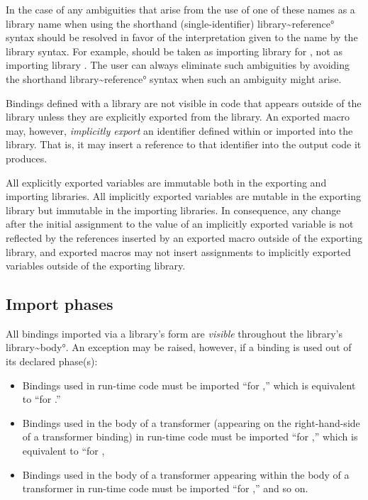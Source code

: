\documentclass{monograph}
\begin{document}
In the case of any ambiguities that arise from the use of one of
these names as a library name when using the shorthand (single-identifier)
\ang{library~reference} syntax should be resolved in favor of the interpretation
given to the name by the library syntax.
For example,  should be taken as
importing library  for , not as importing
library .
The user can always eliminate such ambiguities by avoiding the shorthand
\ang{library~reference} syntax when such an ambiguity might arise.

Bindings defined with a library are not visible in code that appears
outside of the library unless they are explicitly exported from the
library. 
An exported macro may, however, \emph{implicitly export} an identifier
defined within or imported into the library.
That is, it may insert a reference to that identifier into the output code
it produces.

All explicitly exported variables are immutable both in the exporting and
importing libraries.
All implicitly exported variables are mutable in the exporting library but
immutable in the importing libraries.
In consequence, any change after the initial assignment to the value of an
implicitly exported variable is not reflected by the references inserted
by an exported macro outside of the exporting library, and exported macros
may not insert assignments to implicitly exported variables outside of the
exporting library.

\subsection{Import phases\label{sec:phases}}

All bindings imported via a library's  form are
\emph{visible} throughout the library's \ang{library~body}.
An exception may be raised, however, if a binding is used out of its declared
phase(s):

\begin{itemize}
\item Bindings used in run-time code must be imported ``for ,''
which is equivalent to ``for .''
\item Bindings used in the body of a transformer (appearing on the
right-hand-side of a transformer binding) in run-time code must be
imported ``for ,'' which is equivalent to
``for ,
\item Bindings used in the body of a transformer appearing within the body of a
transformer in run-time code must be imported ``for ,''
and so on.
\end{itemize}
\end{document}
